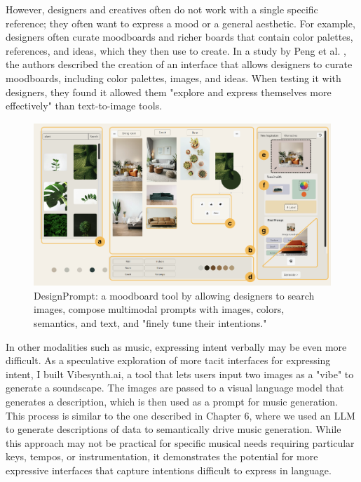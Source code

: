 However, designers and creatives often do not work with a single specific reference; they often want to express a mood or a general aesthetic. For example, designers often curate moodboards and richer boards that contain color palettes, references, and ideas, which they then use to create. In a study by Peng et al. \cite{Peng2024-tr}, the authors described the creation of an interface that allows designers to curate moodboards, including color palettes, images, and ideas. When testing it with designers, they found it allowed them "explore and express themselves more effectively" than text-to-image tools.

\begin{figure}
    \centering
    \includegraphics[width=1\linewidth]{designprompt.png}
    \caption{DesignPrompt: a moodboard tool by \cite{Peng2024-tr} allowing designers to search images, compose multimodal prompts with images, colors, semantics, and text, and "finely tune their intentions."}
    \label{fig:enter-label}
\end{figure}

In other modalities such as music, expressing intent verbally may be even more difficult. As a speculative exploration of more tacit interfaces for expressing intent, I built Vibesynth.ai, a tool that lets users input two images as a "vibe" to generate a soundscape. The images are passed to a visual language model that generates a description, which is then used as a prompt for music generation. This process is similar to the one described in Chapter 6, where we used an LLM to generate descriptions of data to semantically drive music generation. While this approach may not be practical for specific musical needs requiring particular keys, tempos, or instrumentation, it demonstrates the potential for more expressive interfaces that capture intentions difficult to express in language.

